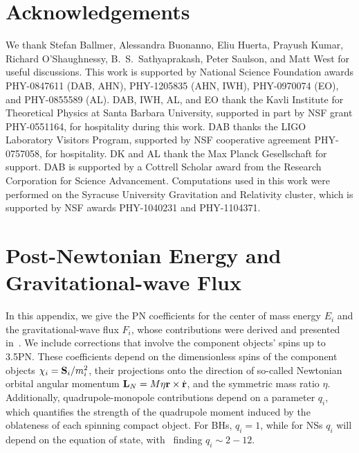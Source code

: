\section*{Acknowledgements}
We thank Stefan Ballmer, Alessandra Buonanno, Eliu Huerta, Prayush Kumar, Richard O'Shaughnessy,
B.~S.~Sathyaprakash, Peter Saulson, and Matt West for useful discussions.  This work is supported
by National Science Foundation awards PHY-0847611 (DAB, AHN), PHY-1205835
(AHN, IWH), PHY-0970074 (EO), and PHY-0855589 (AL). 
DAB, IWH, AL, and EO thank the Kavli Institute for Theoretical Physics at
Santa Barbara University, supported in part by NSF grant PHY-0551164, for
hospitality during this work. DAB thanks the LIGO Laboratory Visitors Program, supported by NSF
cooperative agreement PHY-0757058, for hospitality.
DK and AL thank the Max
Planck Gesellschaft for support. DAB is supported by a Cottrell Scholar award
from the Research Corporation for Science Advancement.  Computations used in
this work were performed on the Syracuse University Gravitation and Relativity
cluster, which is supported by NSF awards PHY-1040231 and PHY-1104371.

\section{Post-Newtonian Energy and Gravitational-wave Flux}
\label{app:EF}


In this appendix, we give the \ac{PN} coefficients for the center of mass energy $E_i$ and
the  gravitational-wave  flux $F_i$, whose contributions were derived and presented
in~\cite{Damour:1999cr, Blanchet:2000nv, Blanchet:2001aw, Kidder:1995zr,
Faye:2006gx, Blanchet:2006gy, Poisson:1997ha, Mikoczi:2005dn, Arun:2008kb, 
Marsat:2012fn, Bohe:2012mr, Bohe:2013cla}.  We
include corrections that involve the component objects' spins up to 3.5\ac{PN}.
These coefficients depend on the dimensionless spins of the component objects
$\chi_i={\bf S}_i / m_i^2$, their projections onto the direction of so-called
Newtonian orbital angular momentum ${\bf L}_N= M \eta {\bf r} \times
\dot{\bf{r}}$, and the symmetric mass ratio $\eta$.  Additionally,
quadrupole-monopole contributions depend on a parameter $q_i$, which quantifies
the strength of the quadrupole moment induced by the oblateness of each
spinning compact object. For BHs, $q_i=1$, while for NSs $q_i$ will depend on
the equation of state, with~\cite{Laarakkers:1997hb} finding $q_i \sim 2 - 12$.

